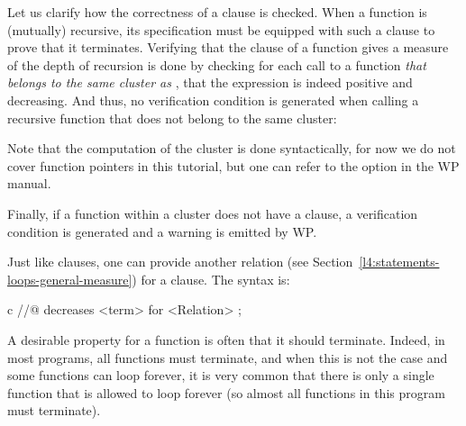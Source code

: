 Let us clarify how the correctness of
a  clause is checked. When a function is (mutually)
recursive, its specification must be equipped with such a clause to prove that
it terminates. Verifying that the  clause of a function
 gives a measure of the depth of recursion is done by checking for
each call to a function \emph{that belongs to the same cluster as
}, that the expression is indeed positive and decreasing. And
thus, no verification condition is generated when calling a recursive function
that does not belong to the same cluster:




\begin{Information}
  Note that the computation of the cluster is done syntactically, for now we do
  not cover function pointers in this tutorial, but one can refer to the option
   in the WP manual.
\end{Information}


Finally, if a function within a cluster does not have a 
clause, a  verification condition is generated
and a warning is emitted by WP.






\begin{Information}
  Just like  clauses, one can provide another relation
  (see Section~\ref{l4:statements-loops-general-measure}) for a
   clause. The syntax is:


  \begin{CodeBlock}{c}
//@ decreases <term> for <Relation> ;
\end{CodeBlock}
\end{Information}


\label{l3:statements-function-calls-terminates}


A desirable property for a function is often that it should terminate. Indeed,
in most programs, all functions must terminate, and when this is not the case and
some functions can loop forever, it is very common that there is only a single
function that is allowed to loop forever (so almost all functions in this
program must terminate).




